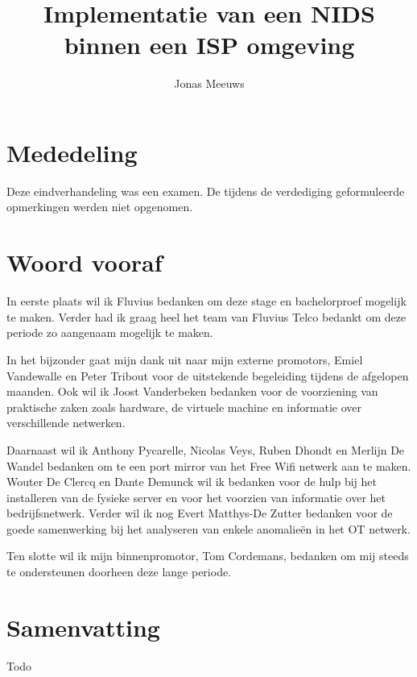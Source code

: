 \documentclass[a4paper,12pt]{report}
\title{Implementatie van een NIDS binnen een ISP omgeving}
\author{Jonas Meeuws}
\begin{document}


\newpage
\thispagestyle{empty}
\mbox{}



\chapter*{Mededeling}
Deze eindverhandeling was een examen.
De tijdens de verdediging geformuleerde opmerkingen werden niet opgenomen.

\chapter*{Woord vooraf}
In eerste plaats wil ik Fluvius bedanken om deze stage en bachelorproef mogelijk te maken.
Verder had ik graag heel het team van Fluvius Telco bedankt om deze periode zo aangenaam mogelijk te maken.

In het bijzonder gaat mijn dank uit naar mijn externe promotors, Emiel Vandewalle en Peter Tribout voor de uitstekende begeleiding tijdens de afgelopen maanden.
Ook wil ik Joost Vanderbeken bedanken voor de voorziening van praktische zaken zoals hardware, de virtuele machine en informatie over verschillende netwerken.

Daarnaast wil ik Anthony Pycarelle, Nicolas Veys, Ruben Dhondt en Merlijn De Wandel bedanken om te een port mirror van het Free Wifi netwerk aan te maken.
Wouter De Clercq en Dante Demunck wil ik bedanken voor de hulp bij het installeren van de fysieke server en voor het voorzien van informatie over het bedrijfsnetwerk.
Verder wil ik nog Evert Matthys-De Zutter bedanken voor de goede samenwerking bij het analyseren van enkele anomalieën in het OT netwerk.

Ten slotte wil ik mijn binnenpromotor, Tom Cordemans, bedanken om mij steeds te ondersteunen doorheen deze lange periode.

\chapter*{Samenvatting}
Todo

\tableofcontents
\newpage
\end{document}

